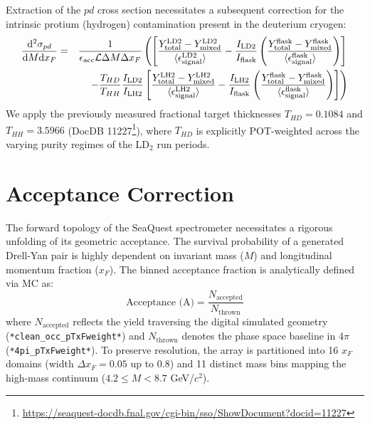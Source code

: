 \documentclass[11pt]{article}
\newcommand{\diffd}{\mathrm{d}}
\begin{document}
Extraction of the $pd$ cross section necessitates a subsequent correction for the intrinsic protium (hydrogen) contamination present in the deuterium cryogen:
\begin{eqnarray}
    \frac{\diffd^{2}\sigma_{pd}}{\diffd M \diffd x_{F}} &=& \frac{1}{\epsilon_{\text{acc}} \mathcal{L} \Delta M \Delta x_{F}} 
    \left(
    \left[ 
        \frac{Y^{\text{LD2}}_{\text{total}} - Y^{\text{LD2}}_{\text{mixed}}}{\langle\epsilon^{\text{LD2}}_{\text{signal}}\rangle} 
        - \frac{I_{\text{LD2}}}{I_{\text{flask}}} 
        \left( \frac{Y^{\text{flask}}_{\text{total}} - Y^{\text{flask}}_{\text{mixed}}}{\langle\epsilon^{\text{flask}}_{\text{signal}}\rangle} \right)
    \right] \right. \nonumber \\
    & & \left. - \frac{T_{HD}}{T_{HH}} \frac{I_{\rm LD2}}{I_{\rm LH2}}\left[ 
        \frac{Y^{\text{LH2}}_{\text{total}} - Y^{\text{LH2}}_{\text{mixed}}}{\langle\epsilon^{\text{LH2}}_{\text{signal}}\rangle} 
        - \frac{I_{\text{LH2}}}{I_{\text{flask}}} 
        \left( \frac{Y^{\text{flask}}_{\text{total}} - Y^{\text{flask}}_{\text{mixed}}}{\langle\epsilon^{\text{flask}}_{\text{signal}}\rangle} \right)
    \right]
    \right)
    \label{eq:modified_cross_section_pd}
\end{eqnarray}
We apply the previously measured fractional target thicknesses $T_{HD}= 0.1084$ and $T_{HH}= 3.5966$ (DocDB 11227\footnote{\url{https://seaquest-docdb.fnal.gov/cgi-bin/sso/ShowDocument?docid=11227}}), where $T_{HD}$ is explicitly POT-weighted across the varying purity regimes of the LD$_2$ run periods.

\FloatBarrier
\section{Acceptance Correction}
\label{sec:acc_correction}

The forward topology of the SeaQuest spectrometer necessitates a rigorous unfolding of its geometric acceptance. The survival probability of a generated Drell-Yan pair is highly dependent on invariant mass ($M$) and longitudinal momentum fraction ($x_F$). The binned acceptance fraction is analytically defined via MC as:
\begin{equation}
\text{Acceptance (A)} = \frac{N_{\text{accepted}}}{N_{\text{thrown}}}
\label{eq:acceptance}
\end{equation}
where $N_{\text{accepted}}$ reflects the yield traversing the digital simulated geometry (\texttt{*clean\_occ\_pTxFweight*}) and $N_{\text{thrown}}$ denotes the phase space baseline in $4\pi$ (\texttt{*4pi\_pTxFweight*}). To preserve resolution, the array is partitioned into 16 $x_F$ domains (width $\Delta x_F = 0.05$ up to 0.8) and 11 distinct mass bins mapping the high-mass continuum ($4.2 \leq M < 8.7$ GeV/$c^2$).
\end{document}
